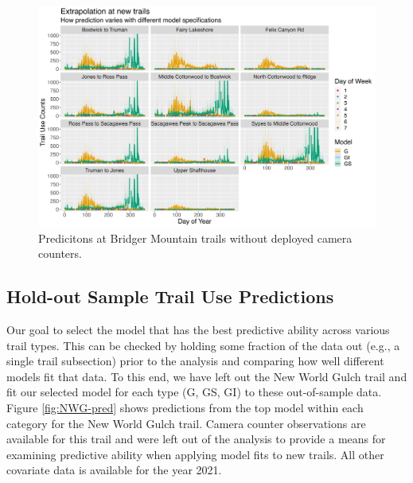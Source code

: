 \documentclass[
]{book}
\begin{document}
\begin{figure}

{\centering \includegraphics[width=1\linewidth]{../figures/NewTrails_compare} 

}

\caption{Predicitons at Bridger Mountain trails without deployed camera counters.}\label{fig:predict-newtrails}
\end{figure}

\hypertarget{hold-out-sample-trail-use-predictions}{%
\subsection{Hold-out Sample Trail Use Predictions}\label{hold-out-sample-trail-use-predictions}}

Our goal to select the model that has the best predictive ability across various trail types. This can be checked by holding some fraction of the data out (e.g., a single trail subsection) prior to the analysis and comparing how well different models fit that data. To this end, we have left out the New World Gulch trail and fit our selected model for each type (G, GS, GI) to these out-of-sample data. Figure \ref{fig:NWG-pred} shows predictions from the top model within each category for the New World Gulch trail. Camera counter observations are available for this trail and were left out of the analysis to provide a means for examining predictive ability when applying model fits to new trails. All other covariate data is available for the year 2021.
\end{document}

